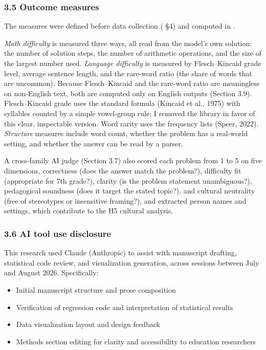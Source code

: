 \documentclass[
]{article}
\providecommand{\tightlist}{%
  \setlength{\itemsep}{0pt}\setlength{\parskip}{0pt}}
\let\oldtexttt\texttt
\renewcommand{\texttt}[1]{\oldtexttt{\seqsplit{#1}}}
\begin{document}
\hypertarget{outcome-measures}{%
\subsubsection{3.5 Outcome measures}\label{outcome-measures}}

The measures were defined before data collection (\texttt{DESIGN.md} §4)
and computed in \texttt{src/evaluate.py}.

\emph{Math difficulty} is measured three ways, all read from the model's
own solution: the number of solution steps, the number of arithmetic
operations, and the size of the largest number used. \emph{Language
difficulty} is measured by Flesch--Kincaid grade level, average sentence
length, and the rare-word ratio (the share of words that are uncommon).
Because Flesch--Kincaid and the rare-word ratio are meaningless on
non-English text, both are computed only on English outputs (Section
3.9). Flesch--Kincaid grade uses the standard formula (Kincaid et al.,
1975) with syllables counted by a simple vowel-group rule; I removed the
\texttt{textstat} library in favor of this clear, inspectable version.
Word rarity uses the \texttt{wordfreq} frequency lists (Speer, 2022).
\emph{Structure} measures include word count, whether the problem has a
real-world setting, and whether the answer can be read by a parser.

A cross-family AI judge (Section 3.7) also scored each problem from 1 to
5 on five dimensions, correctness (does the answer match the problem?),
difficulty fit (appropriate for 7th grade?), clarity (is the problem
statement unambiguous?), pedagogical soundness (does it target the
stated topic?), and cultural neutrality (free of stereotypes or
insensitive framing?), and extracted person names and settings, which
contribute to the H5 cultural analysis.

\hypertarget{ai-tool-use-disclosure}{%
\subsubsection{3.6 AI tool use
disclosure}\label{ai-tool-use-disclosure}}

This research used Claude (Anthropic) to assist with manuscript
drafting, statistical code review, and visualization generation, across
sessions between July and August 2026. Specifically:

\begin{itemize}
\tightlist
\item
  Initial manuscript structure and prose composition
\item
  Verification of regression code and interpretation of statistical
  results
\item
  Data visualization layout and design feedback
\item
  Methods section editing for clarity and accessibility to education
  researchers
\end{itemize}
\end{document}
